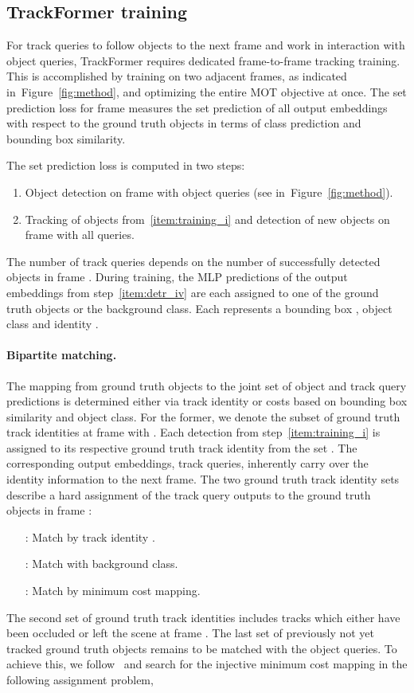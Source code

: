 \documentclass[10pt,twocolumn,letterpaper]{article}
\newcommand{\figref}[1]{Figure~\ref{#1}}
\begin{document}
\subsection{TrackFormer training} \label{sec:trackformer_training}

For track queries to follow objects to the next frame and work in interaction with object queries, TrackFormer requires dedicated frame-to-frame tracking training.
This is accomplished by training on two adjacent frames, as indicated in~\figref{fig:method}, and optimizing the entire MOT objective at once.
The set prediction loss for frame  measures the set prediction of all output embeddings  with respect to the ground truth objects in terms of class prediction and bounding box similarity.

The set prediction loss is computed in two steps:
\begin{enumerate}[label=(\roman*)]
	\itemsep0em
	\item Object detection on frame  with  object queries (see  in~\figref{fig:method}). \label{item:training_i}
	\item Tracking of objects from~\ref{item:training_i} and detection of new objects on frame  with all  queries. \label{item:training_ii}
\end{enumerate}
The number of track queries  depends on the number of successfully detected objects in frame .
During training, the MLP predictions  of the output embeddings from step~\ref{item:detr_iv} are each assigned to one of the ground truth objects  or the background class.
Each  represents a bounding box , object class  and identity .

\paragraph{Bipartite matching.}
The mapping  from ground truth objects  to the joint set of object and track query predictions  is determined either via track identity or costs based on bounding box similarity and object class.
For the former, we denote the subset of ground truth track identities at frame  with .
Each detection from step~\ref{item:training_i} is assigned to its respective ground truth track identity  from the set .
The corresponding output embeddings, \ie track queries, inherently carry over the identity information to the next frame.
The two ground truth track identity sets describe a hard assignment of the  track query outputs to the ground truth objects in frame :
\begin{itemize}
    \setlength{\itemindent}{5em}
    \item[:] Match by track identity .
    \item[:] Match with background class.
    \item[:] Match by minimum cost mapping.
\end{itemize}
The second set of ground truth track identities  includes tracks which either have been occluded or left the scene at frame .
The last set  of previously not yet tracked ground truth objects remains to be matched with the  object queries.
To achieve this, we follow~\cite{DETR} and search for the injective minimum cost mapping  in the following assignment problem,
\end{document}
